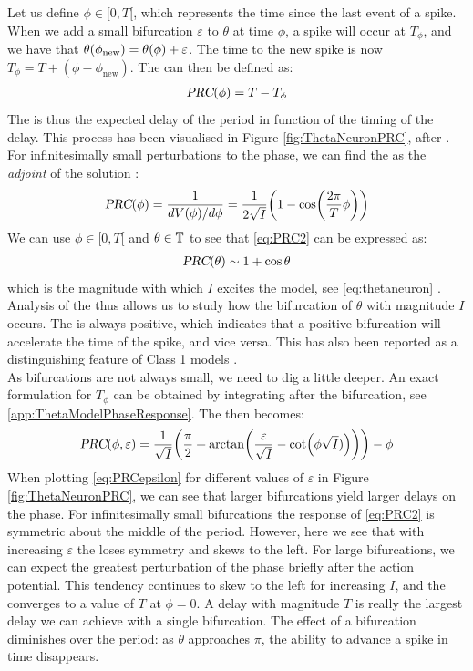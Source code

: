 Let us define $\phi \in [0, T[$, which represents the time since the last event of a spike. When we add a small bifurcation $\varepsilon$ to $\theta$ at time $\phi$, a spike will occur at $T_{\phi}$, and we have that $\theta(\phi_{\rm new}) = \theta(\phi) + \varepsilon$. The time to the new spike is now $T_{\phi} = T + (\phi - \phi_{\text{new}})$. The \PRC can then be defined as:
\begin{align}
{\textsl{PRC}}(\phi) = T - T_{\phi} \label{eq:PRC1}
\end{align}
The \PRC is thus the expected delay of the period in function of the timing of the delay. This process has been visualised in Figure \ref{fig:ThetaNeuronPRC}, after \cite{Perez2020}. For infinitesimally small perturbations to the phase, we can find the \PRC as the \textsl{adjoint} of the solution \cite{Gutkin2014}:
\begin{align}
\PRC(\phi) = \frac{1}{d V(\phi) / d \phi} = \frac{1}{2 \sqrt{I}} \left(1-\cos \left( \frac{2 \pi}{T} \phi \right) \right) \label{eq:PRC2}
\end{align}
We can use $\phi \in [0, T[$ and $\theta \in {\mathbb{T}}$ to see that \eqref{eq:PRC2} can be expressed as:
\begin{align}
{\textsl{PRC}}(\theta) \sim 1 + \cos \theta  \label{eq:PRC3}
\end{align}
which is the magnitude with which $I$ excites the model, see \eqref{eq:thetaneuron} \cite{Ermentrout1996}. Analysis of the \PRC thus allows us to study how the bifurcation of $\theta$ with magnitude $I$ occurs. The \PRC is always positive, which indicates that a positive bifurcation will accelerate the time of the spike, and vice versa. This has also been reported as a distinguishing feature of Class 1 models \cite{Ermentrout1996}. \\

As bifurcations are not always small, we need to dig a little deeper. An exact formulation for $T_{\phi}$ can be obtained by integrating after the bifurcation, see \ref{app:ThetaModelPhaseResponse}. The \PRC then becomes:
\begin{align}
\PRC(\phi, \varepsilon) = \frac{1}{\sqrt{I}}\left(\frac{\pi}{2} + \arctan \left(\frac{\varepsilon}{\sqrt{I}} - \cot \left(\phi\sqrt{I} )\right)\right)\right) - \phi \label{eq:PRCepsilon}
\end{align}
When plotting \eqref{eq:PRCepsilon} for different values of $\varepsilon$ in Figure \ref{fig:ThetaNeuronPRC}, we can see that larger bifurcations yield larger delays on the phase. For infinitesimally small bifurcations the response of \eqref{eq:PRC2} is symmetric about the middle of the period. However, here we see that with increasing $\varepsilon$ the \PRC loses symmetry and skews to the left. For large bifurcations, we can expect the greatest perturbation of the phase briefly after the action potential. This tendency continues to skew to the left for increasing $I$, and the \PRC converges to a value of $T$ at $\phi = 0$. A delay with magnitude $T$ is really the largest delay we can achieve with a single bifurcation. The effect of a bifurcation diminishes over the period: as $\theta$ approaches $\pi$, the ability to advance a spike in time disappears.\\

